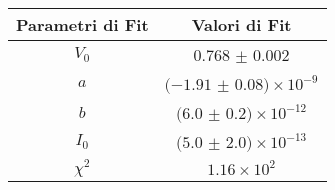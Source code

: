 \begin{tabular}{cc}
\hline
	Parametri di Fit & Valori di Fit\\ 
\hline
	$V_0$ & $0.768$ $\pm$ $0.002$ \\
	$a$ & $(-1.91$ $\pm$ $0.08)\times 10^{-9}$ \\
	$b$ & $(6.0$ $\pm$ $0.2)\times 10^{-12}$ \\
	$I_0$ & $(5.0$ $\pm$ $2.0)\times 10^{-13}$ \\
	$\chi^2$ & $1.16\times 10^{2}$ \\
\hline
\end{tabular}
